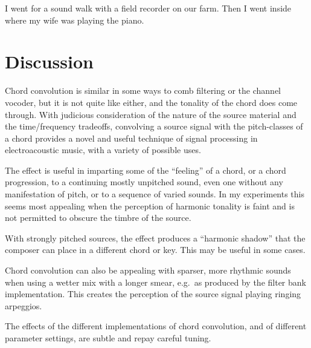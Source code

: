 \documentclass[runningheads,a4paper]{llncs}
\begin{document}
I went for a sound walk with a field recorder on our farm. Then I went inside 
where my wife was playing the piano.

\section{Discussion}

Chord convolution is similar in some ways to comb filtering or the channel 
vocoder, but it is not quite like either, and the tonality of the chord does 
come through. With judicious consideration of the nature of the source 
material and the time/frequency tradeoffs, convolving a source signal with the 
pitch-classes of a chord provides a novel and useful technique of signal 
processing in electroacoustic music, with a variety of possible uses.

The effect is useful in imparting some of the ``feeling'' of a chord, or a 
chord progression, to a continuing mostly unpitched sound, even one without 
any manifestation of pitch, or to a sequence of varied sounds. In my 
experiments this seems most appealing when the perception of harmonic tonality 
is faint and is not permitted to obscure the timbre of the source.

With strongly pitched sources, the effect produces a ``harmonic shadow'' that 
the composer can place in a different chord or key. This may be useful in some 
cases.

Chord convolution can also be appealing with sparser, more rhythmic sounds 
when using a wetter mix with a longer smear, e.g.\ as produced by the filter 
bank implementation. This creates the perception of the source signal playing 
ringing arpeggios.

The effects of the different implementations of chord convolution, and of 
different parameter settings, are subtle and repay careful tuning.



\end{document}
